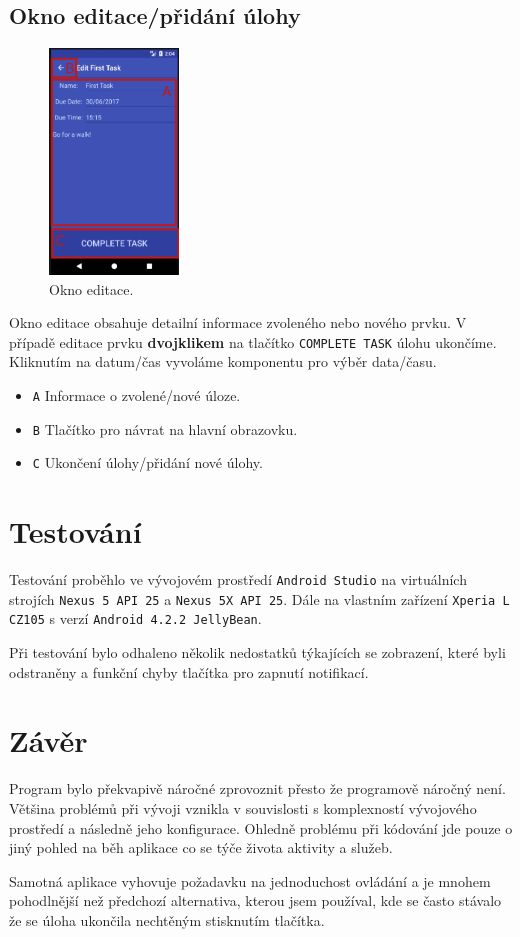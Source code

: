 \documentclass[12pt]{article}
\begin{document}
\subsection{Okno editace/přidání úlohy}
\begin{figure}
\centering
\vspace{-0.5cm}
\includegraphics[height=6cm]{EditWindow.png}
\caption{Okno editace.}
\label{EditWindow}
\end{figure}

Okno editace obsahuje detailní informace zvoleného nebo nového prvku. V případě editace prvku \textbf{dvojklikem} na tlačítko \texttt{COMPLETE TASK} úlohu ukončíme. Kliknutím na datum/čas vyvoláme komponentu pro výběr data/času.

\begin{itemize}
\renewcommand\labelitemi{--}
\setlength\itemsep{1px}
\item{\texttt{A}} Informace o zvolené/nové úloze.
\item{\texttt{B}} Tlačítko pro návrat na hlavní obrazovku.
\item{\texttt{C}} Ukončení úlohy/přidání nové úlohy.
\end{itemize}

\section{Testování}
Testování proběhlo ve vývojovém prostředí \texttt{Android Studio} na virtuálních strojích \texttt{Nexus 5 API 25} a \texttt{Nexus 5X API 25}. Dále na vlastním zařízení \texttt{Xperia L CZ105} s verzí \texttt{Android 4.2.2 JellyBean}. 

Při testování bylo odhaleno několik nedostatků týkajících se zobrazení, které byli odstraněny a funkční chyby tlačítka pro zapnutí notifikací.

\section{Závěr}
Program bylo překvapivě náročné zprovoznit přesto že programově náročný není. Většina problémů při vývoji vznikla v souvislosti s komplexností vývojového prostředí a následně jeho konfigurace. Ohledně problému při kódování jde pouze o jiný pohled na běh aplikace co se týče života aktivity a služeb.

Samotná aplikace vyhovuje požadavku na jednoduchost ovládání a je mnohem pohodlnější než předchozí alternativa, kterou jsem používal, kde se často stávalo že se úloha ukončila nechtěným stisknutím tlačítka.
\end{document}
